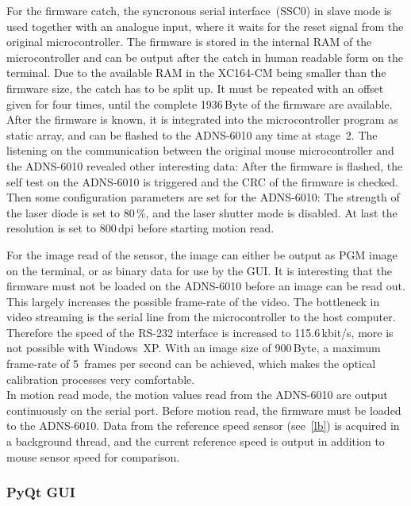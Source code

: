 \documentclass[12pt,a4paper]{article}
\begin{document}
For the firmware catch, the syncronous serial interface~(SSC0) in slave mode is used together with an analogue input, where it waits for the reset signal from the original microcontroller.
The firmware is stored in the internal RAM of the microcontroller and can be output after the catch in human readable form on the terminal.
Due to the available RAM in the XC164-CM being smaller than the firmware size, the catch has to be split up.
It must be repeated with an offset given for four times, until the complete 1936\,Byte of the firmware are available.
After the firmware is known, it is integrated into the microcontroller program as static array, and can be flashed to the ADNS-6010 any time at stage~2.
The listening on the communication between the original mouse microcontroller and the ADNS-6010 revealed other interesting data:
After the firmware is flashed, the self test on the ADNS-6010 is triggered and the CRC of the firmware is checked.
Then some configuration parameters are set for the ADNS-6010:
The strength of the laser diode is set to 80\,\%, and the laser shutter mode is disabled. 
At last the resolution is set to 800\,dpi before starting motion read.

For the image read of the sensor, the image can either be output as PGM image on the terminal, or as binary data for use by the GUI.
It is interesting that the firmware must not be loaded on the ADNS-6010 before an image can be read out.
This largely increases the possible frame-rate of the video.
The bottleneck in video streaming is the serial line from the microcontroller to the host computer.
Therefore the speed of the RS-232 interface is increased to 115.6\,kbit/s, more is not possible with Windows~XP.
With an image size of 900\,Byte, a maximum frame-rate of 5~frames per second can be achieved, which makes the optical calibration processes very comfortable.\\
In motion read mode, the motion values read from the ADNS-6010 are output continuously on the serial port.
Before motion read, the firmware must be loaded to the ADNS-6010.
Data from the reference speed sensor (see~\autoref{lb}) is acquired in a background thread, and the current reference speed is output in addition to mouse sensor speed for comparison.

\subsubsection{PyQt GUI}
\end{document}
